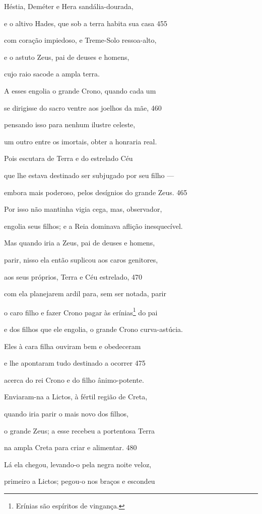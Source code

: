 Héstia, Deméter e Hera sandália-dourada,

e o altivo Hades, que sob a terra habita sua casa \num{455}

com coração impiedoso, e Treme-Solo ressoa-alto,

e o astuto Zeus, pai de deuses e homens,

cujo raio sacode a ampla terra.

A esses engolia o grande Crono, quando cada um

se dirigisse do sacro ventre aos joelhos da mãe, \num{460}

pensando isso para nenhum ilustre celeste,

um outro entre os imortais, obter a honraria real.

Pois escutara de Terra e do estrelado Céu

que lhe estava destinado ser subjugado por seu filho ---

embora mais poderoso, pelos desígnios do grande Zeus. \num{465}

Por isso não mantinha vigia cega, mas, observador,

engolia seus filhos; e a Reia dominava aflição inesquecível.

Mas quando iria a Zeus, pai de deuses e homens,

parir, nisso ela então suplicou aos caros genitores,

aos seus próprios, Terra e Céu estrelado, \num{470}

com ela planejarem ardil para, sem ser notada, parir

o caro filho e fazer Crono pagar às erínias\footnote{Erínias são espíritos de vingança.} do pai

e dos filhos que ele engolia, o grande Crono curva-astúcia.

Eles à cara filha ouviram bem e obedeceram

e lhe apontaram tudo destinado a ocorrer \num{475}

acerca do rei Crono e do filho ânimo-potente.

Enviaram-na a Lictos, à fértil região de Creta,

quando iria parir o mais novo dos filhos,

o grande Zeus; a esse recebeu a portentosa Terra

na ampla Creta para criar e alimentar. \num{480}

Lá ela chegou, levando-o pela negra noite veloz,

primeiro a Lictos; pegou-o nos braços e escondeu

